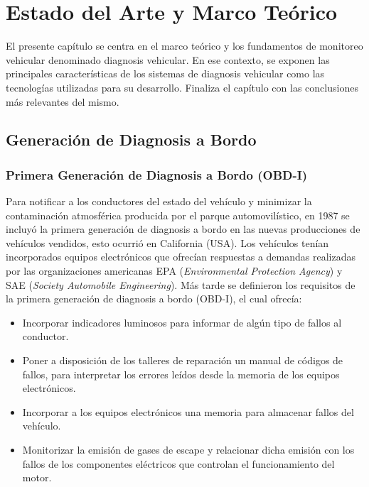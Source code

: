 \chapter[Capítulo 2. Marco Teórico y Fundamentos]{Estado del Arte y Marco Teórico}

El presente capítulo se centra en el  marco teórico y los fundamentos de  monitoreo vehicular denominado diagnosis vehicular. En ese contexto, se exponen las principales características de los sistemas de diagnosis vehicular como las tecnologías utilizadas para su desarrollo. Finaliza el capítulo con las conclusiones más relevantes del mismo.


\section{Generación de Diagnosis a Bordo}

\subsection{Primera Generación de Diagnosis a Bordo (OBD-I)}

Para notificar a los conductores del estado del vehículo y minimizar la contaminación atmosférica producida por el parque automovilístico, en 1987 se incluyó la primera generación de diagnosis a bordo en las nuevas producciones de vehículos vendidos, esto ocurrió en California (USA). Los vehículos tenían incorporados equipos electrónicos que ofrecían respuestas a demandas realizadas por las organizaciones americanas EPA (\textit{Environmental Protection Agency}) y SAE (\textit{Society Automobile Engineering}). 
Más tarde se definieron los requisitos de la primera generación de diagnosis a bordo (OBD-I), el cual ofrecía:

\begin{itemize}
\item Incorporar indicadores luminosos para informar de algún tipo de fallos al conductor.
\item Poner a disposición de los talleres de reparación un manual de códigos de fallos, para interpretar los errores leídos desde la memoria de los equipos electrónicos.
\item Incorporar a los equipos electrónicos una memoria para almacenar fallos del vehículo. 
\item Monitorizar la emisión de gases de escape y relacionar dicha emisión con los fallos de los componentes eléctricos que controlan el funcionamiento del motor.
\end{itemize}

